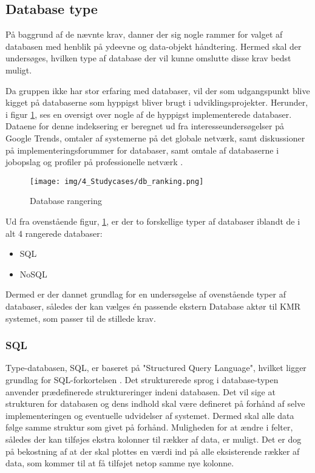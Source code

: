 \begin{appendices}
\subsection{Database type}
På baggrund af de nævnte krav, danner der sig nogle rammer for valget af databasen med henblik på ydeevne og data-objekt håndtering. Hermed skal der undersøges, hvilken type af database der vil kunne omslutte disse krav bedst muligt. 

Da gruppen ikke har stor erfaring med databaser, vil der som udgangspunkt blive kigget på databaserne som hyppigst bliver brugt i udviklingsprojekter. \newline
Herunder, i figur \ref{fig:db_engines_db_ranking}, ses en oversigt over nogle af de hyppigst implementerede databaser. Dataene for denne indeksering er beregnet ud fra interesseundersøgelser på Google Trends, omtaler af systemerne på det globale netværk, samt diskussioner på implementeringsforummer for databaser, samt omtale af databaserne i jobopslag og profiler på professionelle netværk \cite{db_engines_ranking_definition}. 

\begin{figure}[H]
	\centering{}
	\texttt{[image: img/4\_Studycases/db\_ranking.png]}
	\caption{Database rangering}
	\label{fig:db_engines_db_ranking}
\end{figure} 

Ud fra ovenstående figur, \ref{fig:db_engines_db_ranking}, er der to forskellige typer af databaser iblandt de i alt 4 rangerede databaser:
\begin{itemize}
	\item SQL
	\item NoSQL
\end{itemize}

Dermed er der dannet grundlag for en undersøgelse af ovenstående typer af databaser, således der kan vælges én passende ekstern Database aktør til KMR systemet, som passer til de stillede krav.

\subsubsection{SQL}
Type-databasen, SQL, er baseret på "Structured Query Language", hvilket ligger grundlag for SQL-forkortelsen \cite{sql_explained}. \newline
Det strukturerede sprog i database-typen anvender prædefinerede struktureringer indeni databasen. Det vil sige at strukturen for databasen og dens indhold skal være defineret på forhånd af selve implementeringen og eventuelle udvidelser af systemet. Dermed skal alle data følge samme struktur som givet på forhånd. Muligheden for at ændre i felter, således der kan tilføjes ekstra kolonner til rækker af data, er muligt. Det er dog på bekostning af at der skal plottes en værdi ind på alle eksisterende rækker af data, som kommer til at få tilføjet netop samme nye kolonne.


\end{appendices}
